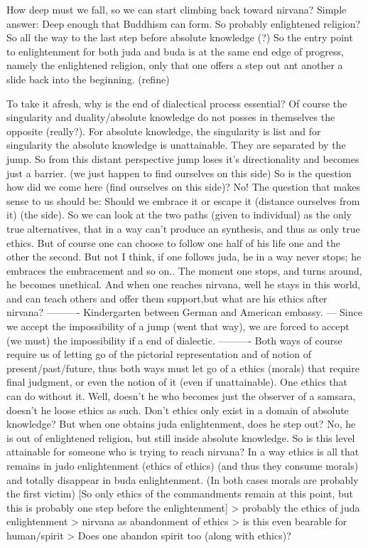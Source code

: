 \documentclass{book}
\begin{document}
How deep must we fall, so we can start climbing back toward nirvana?
Simple answer: Deep enough that Buddhism can form. So probably enlightened religion? So all the way to the last step before absolute knowledge (?) So the entry point to enlightenment for both juda and buda is at the same end edge of progress, namely the enlightened religion, only that one offers a step out ant another a slide back into the beginning. (refine)

To take it afresh, why is the end of dialectical process essential?
Of course the singularity and duality/absolute knowledge do not posses in themselves the opposite (really?). For absolute knowledge, the singularity is list and for singularity the absolute knowledge is unattainable. They are separated by the jump. So from this distant perspective jump loses it's directionality and becomes just a barrier. (we just happen to find ourselves on this side) So is the question how did we come here (find ourselves on this side)? No! The question that makes sense to us should be: Should we embrace it or escape it (distance ourselves from it) (the side). So we can look at the two paths (given to individual) as the only true alternatives, that in a way can't produce an synthesis, and thus as only true ethics. But of course one can choose to follow one half of his life one and the other the second. But not I think, if one follows juda, he in a way never stops; he embraces the embracement and so on.. The moment one stops, and turns around, he becomes unethical.
And when one reaches nirvana, well he stays in this world, and can teach others and offer them support,but what are his ethics after nirvana?
----------
Kindergarten between German and American embassy.
---
Since we accept the impossibility of a jump (went that way), we are forced to accept (we must) the impossibility if a end of dialectic.
----------
Both ways of course require us of letting go of the pictorial representation and of notion of present/past/future, thus both ways must let go of a ethics (morals) that require final judgment, or even the notion of it (even if unattainable). One ethics that can do without it. Well, doesn't he who becomes just the observer of a samsara, doesn't he loose ethics as such. Don't ethics only exist in a domain of absolute knowledge? But when one obtains juda enlightenment, does he step out? No, he is out of enlightened religion, but still inside absolute knowledge.
So is this level attainable for someone who is trying to reach nirvana?
In a way ethics is all that remains in judo enlightenment (ethics of ethics) (and thus they consume morals) and totally disappear in buda enlightenment. (In both cases morals are probably the first victim) [So only ethics of the commandments remain at this point, but this is probably one step before the enlightenment] > probably the ethics of juda enlightenment > nirvana as abandonment of ethics > is this even bearable for human/spirit > 
Does one abandon spirit too (along with ethics)?
\end{document}
